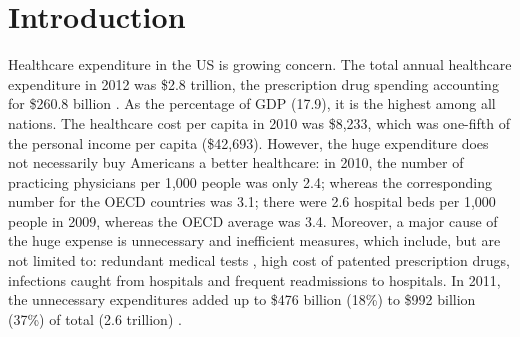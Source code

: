 \section{Introduction}
\label{sec:introduction}
Healthcare expenditure in the US is growing concern. The total annual healthcare expenditure in 2012 was \$2.8 trillion, the prescription drug spending accounting for \$260.8 billion \cite{healthaffairs}. As the percentage of GDP (17.9), it is the highest among all nations. The healthcare cost per capita in 2010 was \$8,233, which was one-fifth of the personal income per capita (\$42,693). However, the huge expenditure does not necessarily buy Americans a better healthcare: in 2010, the number of practicing physicians per 1,000 people was only 2.4; whereas the corresponding number for the OECD countries was 3.1; there were 2.6 hospital beds per 1,000 people in 2009, whereas the OECD average was 3.4. Moreover, a major cause of the huge expense is unnecessary and inefficient measures, which include, but are not limited to: redundant medical tests \cite{seattle}, high cost of patented prescription drugs, infections caught from hospitals and frequent readmissions to hospitals. In 2011, the unnecessary expenditures added up to \$476 billion (18\%) to \$992 billion (37\%) of total (2.6 trillion) \cite{unnecessary}.\\

